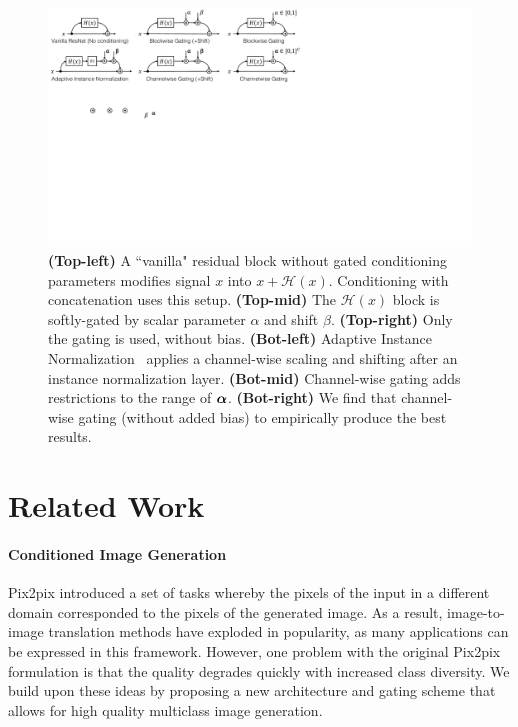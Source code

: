\begin{figure}[t]
    \centering
    \includegraphics[width=\linewidth]{paper_images/arch_gate.pdf}
    \caption{
    {\bf (Top-left)} A ``vanilla" residual block without gated conditioning parameters modifies signal $x$ into $x+\mathcal{H}(x)$. Conditioning with concatenation uses this setup. {\bf (Top-mid)} The $\mathcal{H}(x)$ block is softly-gated by scalar parameter $\alpha$ and shift $\beta$. {\bf (Top-right)} Only the gating is used, without bias. {\bf (Bot-left)} Adaptive Instance Normalization~\cite{huang2017arbitrary} applies a channel-wise scaling and shifting after an instance normalization layer. {\bf (Bot-mid)} Channel-wise gating adds restrictions to the range of $\mbox{\boldmath $\alpha$}$. {\bf (Bot-right)} We find that channel-wise gating (without added bias) to empirically produce the best results.\label{fig:arch-gate} }
\end{figure}

\section{Related Work}

\paragraph{Conditioned Image Generation}
Pix2pix \cite{isola2016image2image} introduced a set of tasks whereby the pixels of the input in a different domain corresponded to the pixels of the generated image.
As a result, image-to-image translation methods have exploded in popularity, as many applications can be expressed in this framework.
However, one problem with the original Pix2pix formulation is that the quality degrades quickly with increased class diversity. 
We build upon these ideas by proposing a new architecture and gating scheme that allows for high quality multiclass image generation. 

